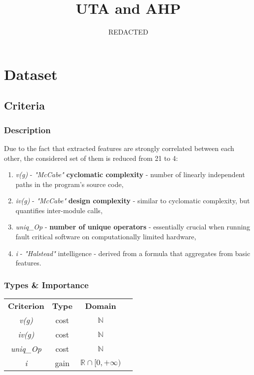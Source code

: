 \documentclass{article}
\title{UTA and AHP}
\author{REDACTED}
\begin{document}
\maketitle

\section{Dataset}

\subsection{Criteria}
\subsubsection{Description}
Due to the fact that extracted features are strongly correlated between each other, the considered set of them is reduced from 21 to 4:

\begin{enumerate}
    \item \textit{v(g)} - \textit{"McCabe"} \textbf{cyclomatic complexity} - number of linearly independent paths in the program's source code,
    \item \textit{iv(g)} - \textit{"McCabe"} \textbf{design complexity} - similar to cyclomatic complexity, but quantifies inter-module calls,
    \item \textit{uniq\_Op} - \textbf{number of unique operators} - essentially crucial when running fault critical software on computationally limited hardware,
    \item \textit{i} - \textit{"Halstead"} intelligence - derived from a formula that aggregates from basic features.
\end{enumerate}

\subsubsection{Types \& Importance}

\begin{center}
\begin{tabular}{ |c|c|c|c| }
    \textbf{Criterion}&  \textbf{Type} & \textbf{Domain} \\
    \textit{v(g)} & cost & $\mathbb{N}$ \\
    \textit{iv(g)} & cost & $\mathbb{N}$ \\
    \textit{uniq\_Op} & cost & $\mathbb{N}$ \\
    \textit{i} & gain & $\mathbb{R} \cap [0, +\infty)$ \\
\end{tabular}
\end{center}
\end{document}
